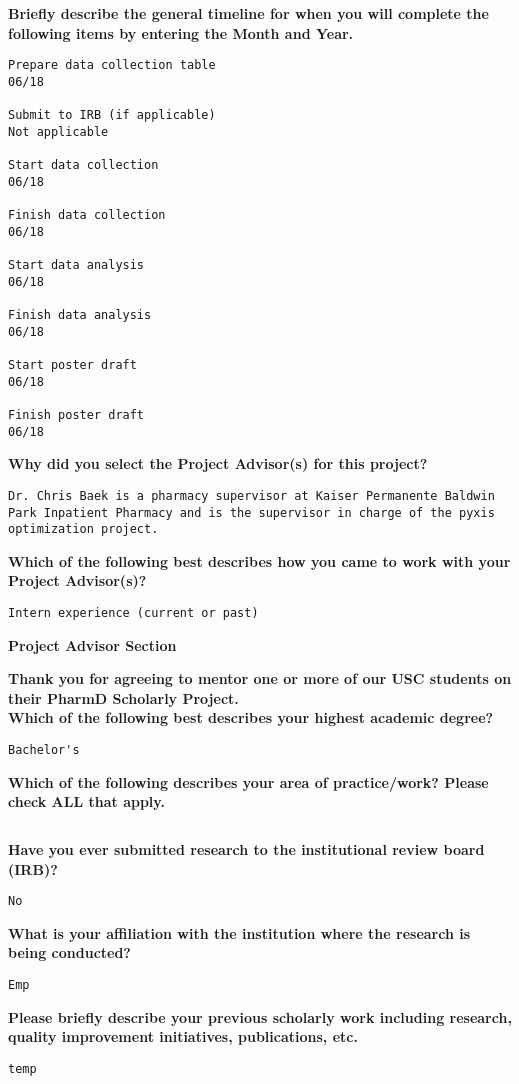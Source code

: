 \documentclass[11pt]{article}
\begin{document}
{\bfseries Briefly describe the general timeline for when you will complete the following items by entering the Month and Year.}
\begin{lstlisting}[mathescape]
Prepare data collection table
06/18

Submit to IRB (if applicable)
Not applicable 

Start data collection
06/18

Finish data collection
06/18

Start data analysis
06/18

Finish data analysis
06/18

Start poster draft
06/18

Finish poster draft
06/18
\end{lstlisting}
\hfill

{\bfseries Why did you select the Project Advisor(s) for this project?}
\begin{lstlisting}[mathescape]
Dr. Chris Baek is a pharmacy supervisor at Kaiser Permanente Baldwin Park Inpatient Pharmacy and is the supervisor in charge of the pyxis optimization project. 
\end{lstlisting}
\hfill

{\bfseries Which of the following best describes how you came to work with your Project Advisor(s)?}
\begin{lstlisting}[mathescape]
Intern experience (current or past)
\end{lstlisting}
\hfill

\pagebreak
\begin{center}
	{\bfseries\large Project Advisor Section}
\end{center}

{\bfseries Thank you for agreeing to mentor one or more of our USC students on their PharmD Scholarly Project.}\\

{\bfseries Which of the following best describes your highest academic degree?}
\begin{lstlisting}[mathescape]
Bachelor's
\end{lstlisting}
\hfill

{\bfseries Which of the following describes your area of practice/work? Please check ALL that apply.}
\begin{lstlisting}[mathescape]

\end{lstlisting}
\hfill

{\bfseries Have you ever submitted research to the institutional review board (IRB)?}
\begin{lstlisting}[mathescape]
No
\end{lstlisting}
\hfill

{\bfseries What is your affiliation with the institution where the research is being conducted?}
\begin{lstlisting}[mathescape]
Emp
\end{lstlisting}
\hfill

{\bfseries Please briefly describe your previous scholarly work including research, quality improvement initiatives, publications, etc.}
\begin{lstlisting}[mathescape]
temp
\end{lstlisting}
\hfill
\end{document}
